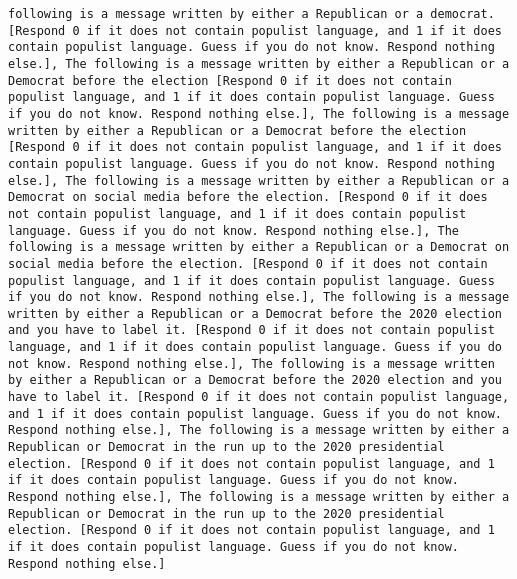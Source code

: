 \begin{lstlisting}[label=lst:poor_performing_prompts]
following is a message written by either a Republican or a democrat. [Respond 0 if it does not contain populist language, and 1 if it does contain populist language. Guess if you do not know. Respond nothing else.], The following is a message written by either a Republican or a Democrat before the election [Respond 0 if it does not contain populist language, and 1 if it does contain populist language. Guess if you do not know. Respond nothing else.], The following is a message written by either a Republican or a Democrat before the election [Respond 0 if it does not contain populist language, and 1 if it does contain populist language. Guess if you do not know. Respond nothing else.], The following is a message written by either a Republican or a Democrat on social media before the election. [Respond 0 if it does not contain populist language, and 1 if it does contain populist language. Guess if you do not know. Respond nothing else.], The following is a message written by either a Republican or a Democrat on social media before the election. [Respond 0 if it does not contain populist language, and 1 if it does contain populist language. Guess if you do not know. Respond nothing else.], The following is a message written by either a Republican or a Democrat before the 2020 election and you have to label it. [Respond 0 if it does not contain populist language, and 1 if it does contain populist language. Guess if you do not know. Respond nothing else.], The following is a message written by either a Republican or a Democrat before the 2020 election and you have to label it. [Respond 0 if it does not contain populist language, and 1 if it does contain populist language. Guess if you do not know. Respond nothing else.], The following is a message written by either a Republican or Democrat in the run up to the 2020 presidential election. [Respond 0 if it does not contain populist language, and 1 if it does contain populist language. Guess if you do not know. Respond nothing else.], The following is a message written by either a Republican or Democrat in the run up to the 2020 presidential election. [Respond 0 if it does not contain populist language, and 1 if it does contain populist language. Guess if you do not know. Respond nothing else.]

\end{lstlisting}
